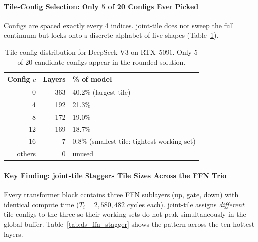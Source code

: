 \paragraph{Tile-Config Selection: Only 5 of 20 Configs Ever Picked}

Configs are spaced exactly every 4 indices. joint-tile does not sweep the full continuum but locks onto a discrete alphabet of five shapes (Table~\ref{tab:ds_tile_configs}).

\begin{table}[ht!]
\centering
\caption{Tile-config distribution for DeepSeek-V3 on RTX~5090.
Only 5 of 20 candidate configs appear in the rounded solution.}
\label{tab:ds_tile_configs}
\begin{tabular}{rrl}
\toprule
\textbf{Config $c$} & \textbf{Layers} & \textbf{\% of model} \\
\midrule
0  & 363 & 40.2\% \quad (largest tile) \\
4  & 192 & 21.3\% \\
8  & 172 & 19.0\% \\
12 & 169 & 18.7\% \\
16 &   7 &  0.8\% \quad (smallest tile: tightest working set) \\
\midrule
others & 0 & unused \\
\bottomrule
\end{tabular}
\end{table}

\paragraph{Key Finding: joint-tile Staggers Tile Sizes Across the FFN Trio}

Every transformer block contains three FFN sublayers (up, gate, down) with identical compute time ($T_i = 2{,}580{,}482$ cycles each). joint-tile assigns \emph{different} tile configs to the three so their working sets do not peak simultaneously in the global buffer.
Table~\ref{tab:ds_ffn_stagger} shows the pattern across the ten hottest layers.

